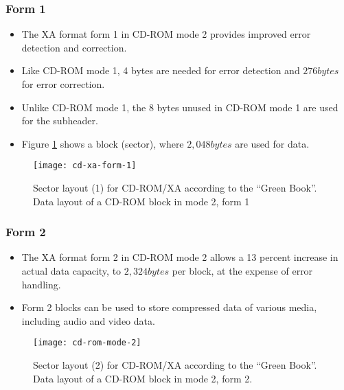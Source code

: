 \subsubsection{Form 1}
\begin{itemize}
	\item The XA format form 1 in CD-ROM mode 2 provides improved error detection and correction. 
	\item Like CD-ROM mode 1, 4 bytes are needed for error detection and $ 276 bytes $ for error correction.
	\item Unlike CD-ROM mode 1, the 8 bytes	unused in CD-ROM mode 1 are used for the subheader. 
	\item Figure \ref{fig:cd-xa-form-1} shows a block (sector), where  $2,048 bytes$ are used for data.
\end{itemize}

\begin{figure}[ht!]
	\centering
	\texttt{[image: cd-xa-form-1]}
	\caption[Sector layout (1) for CD-ROM/XA according to the ``Green Book''.]{Sector layout (1) for CD-ROM/XA according to the ``Green Book''. Data layout of a CD-ROM block in mode 2, form 1}{\label{fig:cd-xa-form-1}}
\end{figure}


\subsubsection{Form 2}

\begin{itemize}
	\item The XA format form 2 in CD-ROM mode 2 allows a 13 percent increase in actual data capacity, to $ 2,324 bytes $ per block, at the expense of error handling.
	\item Form 2 blocks can be used to store compressed data of various media, including audio and video data.
\end{itemize}

\begin{figure}[ht!]
	\centering
	\texttt{[image: cd-rom-mode-2]}
	\caption[Sector layout (2) for CD-ROM/XA according to the ``Green Book''.]{Sector layout (2) for CD-ROM/XA according to the ``Green Book''. Data layout of a CD-ROM block in mode 2, form 2.}{\label{fig:cd-xa-form-2}}
\end{figure}

